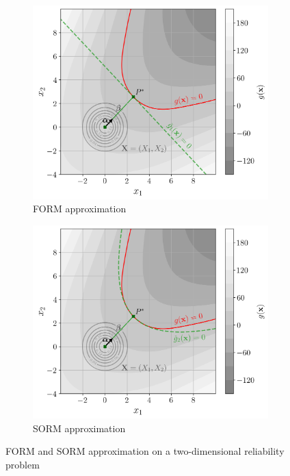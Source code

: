 \begin{figure}[ht]
    \centering
    \begin{subfigure}[b]{0.48\textwidth}
        \centering
        \includegraphics[width=\textwidth]{../numerical_experiments/chapter1/figures/reliability_FORM_illustration.png}
        \caption{FORM approximation}
    \end{subfigure}
    \quad
    \begin{subfigure}[b]{0.48\textwidth}
        \centering
        \includegraphics[width=\textwidth]{../numerical_experiments/chapter1/figures/reliability_SORM_illustration.png}
        \caption{SORM approximation}
    \end{subfigure}
       \caption{FORM and SORM approximation on a two-dimensional reliability problem}
       \label{fig:FORM_SORM_approx}
\end{figure}


